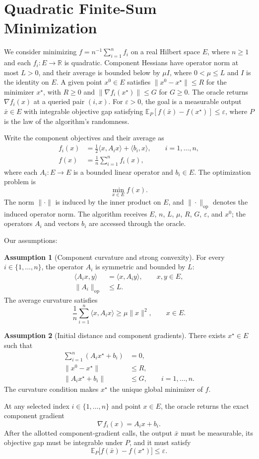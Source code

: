 \documentclass[10pt]{article}
\theoremstyle{definition}
\newtheorem{assumption}{Assumption}
\begin{document}
\section*{Quadratic Finite-Sum Minimization}
We consider minimizing $f=n^{-1}\sum_{i=1}^n f_i$ on a real Hilbert space $E$, where $n\geq1$ and each $f_i:E\to\mathbb{R}$ is quadratic. Component Hessians have operator norm at most $L>0$, and their average is bounded below by $\mu I$, where $0<\mu\leq L$ and $I$ is the identity on $E$. A given point $x^0\in E$ satisfies $\|x^0-x^\star\|\leq R$ for the minimizer $x^\star$, with $R\geq0$ and $\|\nabla f_i(x^\star)\|\leq G$ for $G\geq0$. The oracle returns $\nabla f_i(x)$ at a queried pair $(i,x)$. For $\varepsilon>0$, the goal is a measurable output $\bar{x}\in E$ with integrable objective gap satisfying $\mathbb{E}_{P}[f(\bar{x})-f(x^\star)]\leq\varepsilon$, where $P$ is the law of the algorithm's randomness.

Write the component objectives and their average as
\[
\begin{aligned}
f_i(x)&=\frac12\langle x,A_i x\rangle+\langle b_i,x\rangle,\qquad i=1,\ldots,n,\\
f(x)&=\frac1n\sum_{i=1}^n f_i(x),
\end{aligned}
\]
where each $A_i:E\to E$ is a bounded linear operator and $b_i\in E$. The optimization problem is
\[
\min_{x\in E} f(x).
\]
The norm $\|\cdot\|$ is induced by the inner product on $E$, and $\|\cdot\|_{\mathrm{op}}$ denotes the induced operator norm. The algorithm receives $E$, $n$, $L$, $\mu$, $R$, $G$, $\varepsilon$, and $x^0$; the operators $A_i$ and vectors $b_i$ are accessed through the oracle.

Our assumptions:
\begin{assumption}[Component curvature and strong convexity]
For every $i\in\{1,\ldots,n\}$, the operator $A_i$ is symmetric and bounded by $L$:
\[
\begin{aligned}
\langle A_i x,y\rangle&=\langle x,A_i y\rangle,\qquad x,y\in E,\\
\|A_i\|_{\mathrm{op}}&\leq L.
\end{aligned}
\]
The average curvature satisfies
\[
\frac1n\sum_{i=1}^n\langle x,A_i x\rangle\geq\mu\|x\|^2,
\qquad x\in E.
\]
\end{assumption}

\begin{assumption}[Initial distance and component gradients]
There exists $x^\star\in E$ such that
\[
\begin{aligned}
\sum_{i=1}^n(A_i x^\star+b_i)&=0,\\
\|x^0-x^\star\|&\leq R,\\
\|A_i x^\star+b_i\|&\leq G,\qquad i=1,\ldots,n.
\end{aligned}
\]
The curvature condition makes $x^\star$ the unique global minimizer of $f$.
\end{assumption}

At any selected index $i\in\{1,\ldots,n\}$ and point $x\in E$, the oracle returns the exact component gradient
\[
\nabla f_i(x)=A_i x+b_i.
\]
After the allotted component-gradient calls, the output $\bar{x}$ must be measurable, its objective gap must be integrable under $P$, and it must satisfy
\[
\mathbb{E}_{P}\bigl[f(\bar{x})-f(x^\star)\bigr]\leq\varepsilon.
\]
\end{document}
